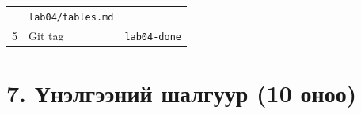 \begin{longtable}[]{@{}lll@{}}
\begin{minipage}[t]{0.30\columnwidth}
\end{minipage} & \begin{minipage}[t]{0.30\columnwidth}\raggedright
\texttt{lab04/tables.md}\strut
\end{minipage}\tabularnewline
\begin{minipage}[t]{0.30\columnwidth}\raggedright
5\strut
\end{minipage} & \begin{minipage}[t]{0.30\columnwidth}\raggedright
Git tag\strut
\end{minipage} & \begin{minipage}[t]{0.30\columnwidth}\raggedright
\texttt{lab04-done}\strut
\end{minipage}\tabularnewline
\bottomrule
\end{longtable}\endgroup

\hypertarget{ux4afux43dux44dux43bux433ux44dux44dux43dux438ux439-ux448ux430ux43bux433ux443ux443ux440-10-ux43eux43dux43eux43e}{%
\section{7. Үнэлгээний шалгуур (10 оноо)}\label{ux4afux43dux44dux43bux433ux44dux44dux43dux438ux439-ux448ux430ux43bux433ux443ux443ux440-10-ux43eux43dux43eux43e}}

